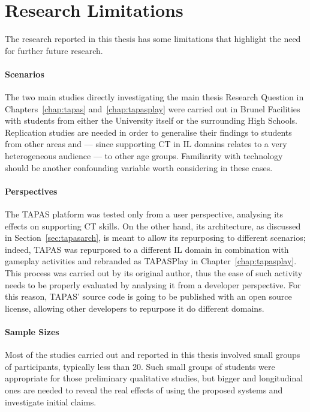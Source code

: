 \section{Research Limitations}
The research reported in this thesis has some limitations that highlight the need for further future research.

\paragraph{Scenarios} The two main studies directly investigating the main thesis Research Question in Chapters~\ref{chap:tapas} and~\ref{chap:tapasplay} were carried out in Brunel Facilities with students from either the University itself or the surrounding High Schools. Replication studies are needed in order to generalise their findings to students from other areas and --- since supporting \ac{CT} in \ac{IL} domains relates to a very heterogeneous audience --- to other age groups. Familiarity with technology should be another confounding variable worth considering in these cases.

\paragraph{Perspectives} The \ac{TAPAS} platform was tested only from a user perspective, analysing its effects on supporting \ac{CT} skills. On the other hand, its architecture, as discussed in Section~\ref{sec:tapasarch}, is meant to allow its repurposing to different scenarios; indeed, \ac{TAPAS} was repurposed to a different \ac{IL} domain in combination with gameplay activities and rebranded as TAPASPlay in Chapter~\ref{chap:tapasplay}. This process was carried out by its original author, thus the ease of such activity needs to be properly evaluated by analysing it from a developer perspective. For this reason, \ac{TAPAS}' source code is going to be published with an open source license, allowing other developers to repurpose it do different domains.

\paragraph{Sample Sizes} Most of the studies carried out and reported in this thesis involved small groups of participants, typically less than 20. Such small groups of students were appropriate for those preliminary qualitative studies, but bigger and longitudinal ones are needed to reveal the real effects of using the proposed systems and investigate initial claims.

